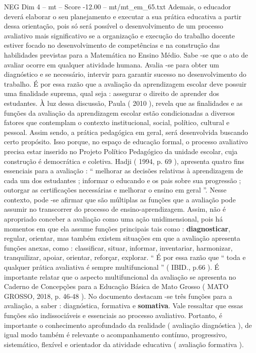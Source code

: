 \begin{textsample}{NEG Dim 4 – mt – Score -12.00 – mt/mt\_em\_65.txt}
Ademais, o educador deverá elaborar o seu planejamento e executar a sua prática educativa a partir dessa orientação, pois só será possível o desenvolvimento de um processo avaliativo mais significativo se a organização e execução do trabalho docente estiver focado no desenvolvimento de competências e na construção das habilidades previstas para a Matemática no Ensino Médio.
Sabe -se que o ato de avaliar ocorre em qualquer atividade humana.
Avalia -se para obter um diagnóstico e se necessário, intervir para garantir sucesso no desenvolvimento do trabalho.
É por essa razão que a avaliação da aprendizagem escolar deve possuir uma finalidade suprema, qual seja : assegurar o direito de aprender dos estudantes.
À luz dessa discussão, Paula ( 2010 ), revela que as finalidades e as funções da avaliação da aprendizagem escolar estão condicionadas a diversos fatores que contemplam o contexto institucional, social, político, cultural e pessoal.
Assim sendo, a prática pedagógica em geral, será desenvolvida buscando certo propósito.
Isso porque, no espaço de educação formal, o processo avaliativo precisa estar inserido no Projeto Político Pedagógico da unidade escolar, cuja construção é democrática e coletiva.
Hadji ( 1994, p. 69 ), apresenta quatro fins essenciais para a avaliação : “ melhorar as decisões relativas à aprendizagem de cada um dos estudantes ; informar o educando e os pais sobre sua progressão ; outorgar as certificações necessárias e melhorar o ensino em geral ”.
Nesse contexto, pode -se afirmar que são múltiplas as funções que a avaliação pode assumir no transcorrer do processo de ensino-aprendizagem.
Assim, não é apropriado conceber a avaliação como uma ação unidimensional, pois há momentos em que ela assume funções principais tais como : \textbf{diagnosticar}, regular, orientar, mas também existem situações em que a avaliação apresenta funções anexas, como : classificar, situar, informar, inventariar, harmonizar, tranquilizar, apoiar, orientar, reforçar, explorar. “ É por essa razão que “ toda e qualquer prática avaliativa é sempre multifuncional ” ( IBID., p.66 ).
É importante relatar que o aspecto multifuncional da avaliação se apresenta no Caderno de Concepções para a Educação Básica de Mato Grosso ( MATO GROSSO, 2018, p. 46-48 ).
No documento destacam -se três funções para a avaliação, a saber : diagnóstica, formativa e \textbf{somativa}.
Vale ressaltar que essas funções são indissociáveis e essenciais ao processo avaliativo.
Portanto, é importante o conhecimento aprofundado da realidade ( avaliação diagnóstica ), de igual modo também é relevante o acompanhamento contínuo, progressivo, sistemático, flexível e orientador da atividade educativa ( avaliação formativa ).

\end{textsample}
